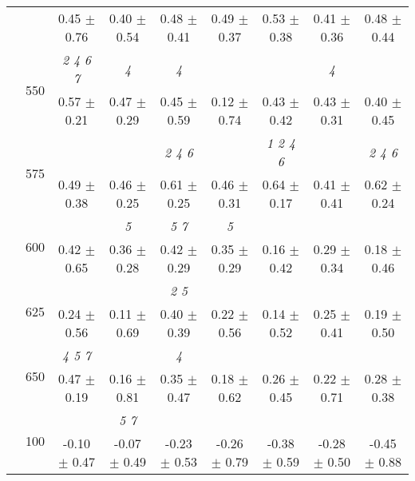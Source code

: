 \begin{table}[h]
{\begin{tabular}{
        ccccccccc}
 & & \cellcolor[HTML]{EFEFEF} 0.45 $\pm$ 0.76& \cellcolor[HTML]{EFEFEF} 0.40 $\pm$ 0.54& \cellcolor[HTML]{EFEFEF} 0.48 $\pm$ 0.41& \cellcolor[HTML]{EFEFEF} 0.49 $\pm$ 0.37& \cellcolor[HTML]{EFEFEF} 0.53 $\pm$ 0.38& \cellcolor[HTML]{EFEFEF} 0.41 $\pm$ 0.36& \cellcolor[HTML]{EFEFEF} 0.48 $\pm$ 0.44 \\ 
 & \multirow{2}{*}{550}& \textit{ 2 4 6 7 }& \textit{ 4 }& \textit{ 4 }& & & \textit{ 4 }&  \\ 
 & & 0.57 $\pm$ 0.21& 0.47 $\pm$ 0.29& 0.45 $\pm$ 0.59& 0.12 $\pm$ 0.74& 0.43 $\pm$ 0.42& 0.43 $\pm$ 0.31& 0.40 $\pm$ 0.45 \\ 
 & \multirow{2}{*}{575}& \cellcolor[HTML]{EFEFEF} & \cellcolor[HTML]{EFEFEF} & \cellcolor[HTML]{EFEFEF} \textit{ 2 4 6 }& \cellcolor[HTML]{EFEFEF} & \cellcolor[HTML]{EFEFEF} \textit{ 1 2 4 6 }& \cellcolor[HTML]{EFEFEF} & \cellcolor[HTML]{EFEFEF} \textit{ 2 4 6 } \\ 
 & & \cellcolor[HTML]{EFEFEF} 0.49 $\pm$ 0.38& \cellcolor[HTML]{EFEFEF} 0.46 $\pm$ 0.25& \cellcolor[HTML]{EFEFEF} 0.61 $\pm$ 0.25& \cellcolor[HTML]{EFEFEF} 0.46 $\pm$ 0.31& \cellcolor[HTML]{EFEFEF} 0.64 $\pm$ 0.17& \cellcolor[HTML]{EFEFEF} 0.41 $\pm$ 0.41& \cellcolor[HTML]{EFEFEF} 0.62 $\pm$ 0.24 \\ 
 & \multirow{2}{*}{600}& & \textit{ 5 }& \textit{ 5 7 }& \textit{ 5 }& & &  \\ 
 & & 0.42 $\pm$ 0.65& 0.36 $\pm$ 0.28& 0.42 $\pm$ 0.29& 0.35 $\pm$ 0.29& 0.16 $\pm$ 0.42& 0.29 $\pm$ 0.34& 0.18 $\pm$ 0.46 \\ 
 & \multirow{2}{*}{625}& \cellcolor[HTML]{EFEFEF} & \cellcolor[HTML]{EFEFEF} & \cellcolor[HTML]{EFEFEF} \textit{ 2 5 }& \cellcolor[HTML]{EFEFEF} & \cellcolor[HTML]{EFEFEF} & \cellcolor[HTML]{EFEFEF} & \cellcolor[HTML]{EFEFEF}  \\ 
 & & \cellcolor[HTML]{EFEFEF} 0.24 $\pm$ 0.56& \cellcolor[HTML]{EFEFEF} 0.11 $\pm$ 0.69& \cellcolor[HTML]{EFEFEF} 0.40 $\pm$ 0.39& \cellcolor[HTML]{EFEFEF} 0.22 $\pm$ 0.56& \cellcolor[HTML]{EFEFEF} 0.14 $\pm$ 0.52& \cellcolor[HTML]{EFEFEF} 0.25 $\pm$ 0.41& \cellcolor[HTML]{EFEFEF} 0.19 $\pm$ 0.50 \\ 
 & \multirow{2}{*}{650}& \textit{ 4 5 7 }& & \textit{ 4 }& & & &  \\ 
 & & 0.47 $\pm$ 0.19& 0.16 $\pm$ 0.81& 0.35 $\pm$ 0.47& 0.18 $\pm$ 0.62& 0.26 $\pm$ 0.45& 0.22 $\pm$ 0.71& 0.28 $\pm$ 0.38 \\ \midrule 
 & \multirow{2}{*}{100}& & \textit{ 5 7 }& & & & &  \\ 
 & & -0.10 $\pm$ 0.47& -0.07 $\pm$ 0.49& -0.23 $\pm$ 0.53& -0.26 $\pm$ 0.79& -0.38 $\pm$ 0.59& -0.28 $\pm$ 0.50& -0.45 $\pm$ 0.88 \\ 

\end{tabular}}
\end{table}

